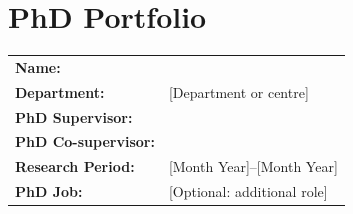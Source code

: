 
\newcommand{\pfrule}{%
	\par\noindent{\color{pfaccent!55}\rule{\linewidth}{0.5pt}}\vspace{6pt}\par
}

\newcommand{\pfentry}[4]{%
	\par\noindent
	\begin{minipage}[t]{0.16\textwidth}
		\color{pfaccent}\bfseries #1
	\end{minipage}%
	\begin{minipage}[t]{0.82\textwidth}
		\textbf{#2}\\[1pt]
		{\small\itshape #3}\\[5pt]
		#4
	\end{minipage}
	\par\vspace{10pt}
}

\newcommand{\pfentrysimple}[3]{%
	\par\noindent
	\begin{minipage}[t]{0.16\textwidth}
		\color{pfaccent}\bfseries #1
	\end{minipage}%
	\begin{minipage}[t]{0.82\textwidth}
		\textbf{#2}\\[2pt]
		{\itshape #3}
	\end{minipage}
	\par\vspace{10pt}
}

\section*{PhD Portfolio}

\noindent
\begin{tabularx}{\textwidth}{@{}>{\bfseries}l X@{}}
	Name:              & \ThesisAuthor \\[2pt]
	Department:        & [Department or centre] \\[2pt]
	PhD Supervisor:    & \ThesisSupervisor \\[2pt]
	PhD Co-supervisor: & \ThesisCoSupervisor \\[2pt]
	Research Period:   & [Month Year]--[Month Year] \\[2pt]
	PhD Job:           & [Optional: additional role] \\
\end{tabularx}

